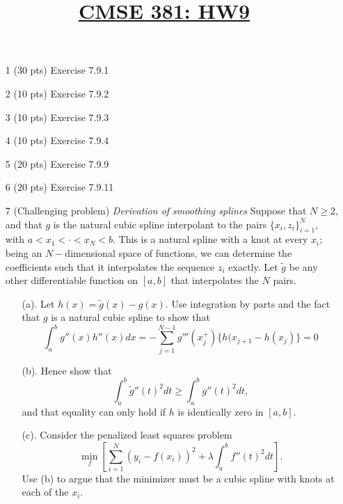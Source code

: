 \documentclass[11pt]{article}
\title{\underline{CMSE 381: HW9}}
\date{}
\newcommand{\blankline}{\quad\pagebreak[2]}
\begin{document}
\maketitle

\blankline

\begin{enumerate}
	\item[1] (30 pts) Exercise 7.9.1
	\item[2] (10 pts) Exercise 7.9.2 
	\item[3] (10 pts) Exercise 7.9.3
	\item[4] (10 pts) Exercise 7.9.4
	\item[5] (20 pts) Exercise 7.9.9
	\item[6] (20 pts) Exercise 7.9.11
	\item[7] (Challenging problem) \textit{Derivation of smoothing splines} Suppose that $N \geq 2$, and that $g$ is the natural cubic spline interpolant to the pairs $\{x_i, z_i \}_{i=1}^N$, with $a < x_1 < \cdot < x_N < b$. This is a natural spline with a knot at every $x_i$; being an $N-$dimensional space of functions, we can determine the coefficients such that it interpolates the sequence $z_i$ exactly.
Let $\tilde{g}$ be any other differentiable function on $[a, b]$ that interpolates the $N$ pairs. 
\begin{itemize}
	\item[(a).] Let $h(x) = \tilde{g}(x) - g(x)$. Use integration by parts and the fact that $g$ is a natural cubic spline to show that 
	\[
	\int_a^b g''(x) h''(x) dx = - \sum_{j =1}^{N - 1} g'''(x^+_j) \{ h(x_{j + 1} - h(x_j) \} = 0 
	\]
	\item[(b).] Hence show that 
	\[
		\int_a^b \tilde{g}''(t)^2 dt  \geq \int_a^b g''(t)^2 dt,
	\]
	and that equality can only hold if $h$ is identically zero in $[a, b]$.
	\item[(c).] Consider the penalized least squares problem
	\[
	\min_f \left[ \sum_{i= 1}^N (y_i - f(x_i))^2 + \lambda \int_a^b f''(t)^2 dt  \right].
	\]
	Use (b) to argue that the minimizer must be a cubic spline with knots at each of the $x_i$.
\end{itemize}


\end{enumerate}
\end{document}

